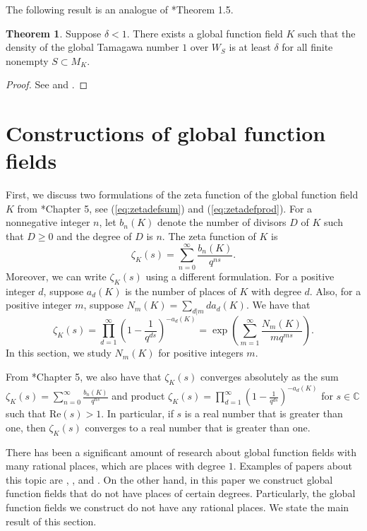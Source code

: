 \documentclass[12pt,letterpaper]{amsart}
\theoremstyle{definition}
\newtheorem{theorem}{Theorem}[section]
\newcommand{\pref}[1]{(\ref{#1})}
\begin{document}
The following result is an analogue of \cite{ProdNF}*{Theorem 1.5}.

\begin{theorem}
\label{thm:existence}
Suppose $\delta<1$. There exists a global function field $K$ such that the density of the global Tamagawa number $1$ over $W_S$ is at least $\delta$ for all finite nonempty $S\subset M_K$.
\end{theorem}

\begin{proof}
See  and .
\end{proof}

\section{Constructions of global function fields}
\label{sec:construction}

First, we discuss two formulations of the zeta function of the global function field $K$ from \cite{NTFunc}*{Chapter 5}, see \pref{eq:zetadefsum} and \pref{eq:zetadefprod}. For a nonnegative integer $n$, let $b_n(K)$ denote the number of divisors $D$ of $K$ such that $D\geq 0$ and the degree of $D$ is $n$. The zeta function of $K$ is 
\begin{equation}
\label{eq:zetadefsum}
\zeta_K(s)=\sum_{n=0}^\infty\frac{b_n(K)}{q^{ns}}.
\end{equation}
Moreover, we can write $\zeta_K(s)$ using a different formulation. For a positive integer $d$, suppose $a_d(K)$ is the number of places of $K$ with degree $d$. Also, for a positive integer $m$, suppose $N_m(K)=\sum_{d|m} da_d(K)$. We have that
\begin{equation}
\label{eq:zetadefprod}
\zeta_K(s)=\prod_{d= 1}^\infty\left(1-\frac{1}{q^{ds}}\right)^{-a_d(K)}=\exp\left(\sum_{m=1}^\infty\frac{N_m(K)}{mq^{ms}}\right).
\end{equation}
In this section, we study $N_m(K)$ for positive integers $m$.

From \cite{NTFunc}*{Chapter 5}, we also have that $\zeta_K(s)$ converges absolutely as the sum $\zeta_K(s)=\sum_{n=0}^\infty\frac{b_n(K)}{q^{ns}}$ and product $\zeta_K(s)=\prod_{d= 1}^\infty\left(1-\frac{1}{q^{ds}}\right)^{-a_d(K)}$ for $s\in\mathbb{C}$ such that $\text{Re}(s)>1$. In particular, if $s$ is a real number that is greater than one, then $\zeta_K(s)$ converges to a real number that is greater than one.

There has been a significant amount of research about global function fields with many rational places, which are places with degree $1$. Examples of papers about this topic are \cite{AuerRCF}, \cite{RP1}, and \cite{RP2}. On the other hand, in this paper we construct global function fields that do not have places of certain degrees. Particularly, the global function fields we construct do not have any rational places. We state the main result of this section.
\end{document}
